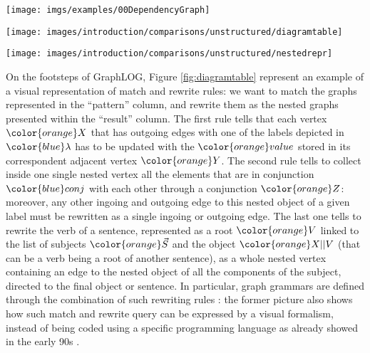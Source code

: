\begin{figure*}[!p]
	\centering
	\texttt{[image: imgs/examples/00DependencyGraph]}
	\caption{Graph representation of the following sentence from Wikipedia: ``\textit{The discovery and publication in 1987 of an early correspondence between Einstein and Maric revealed that they had had a daughter was staying with her parents.}''. }
	\label{fig:dependencygraph}
\end{figure*} 
\begin{figure*}[!pth]
	\begin{minipage}[b]{\textwidth}
		\centering
		\texttt{[image: images/introduction/comparisons/unstructured/diagramtable]}
		\label{fig:diagramtable}
	\end{minipage}
	\begin{minipage}[b]{\textwidth}
		\centering
		\texttt{[image: images/introduction/comparisons/unstructured/nestedrepr]}
		\label{fig:nestedrepr}
	\end{minipage}
	\caption{Translating the full-text representation as a graph in Figure \ref{fig:dependencygraph}: this requires a graph transformation language and the definition of nested graphs.}
	\label{fig:globalconversiontext}
\end{figure*}
	On the footsteps of GraphLOG, Figure \ref{fig:diagramtable} represent an example of a visual representation of match and rewrite rules: we want to match the graphs represented in the ``pattern'' column, and rewrite them as the nested graphs presented within the ``result'' column. 
	The first rule tells that each vertex $\color{orange}X$ that has outgoing edges with one of the labels depicted in $\color{blue}\lambda$ has to be updated with the $\color{orange} value$ stored in its correspondent adjacent vertex $\color{orange} Y$. The second rule tells to collect inside one single nested vertex all the elements that are in conjunction $\color{blue}conj$ with each other through a conjunction $\color{orange} Z$: moreover, any other ingoing and outgoing edge to this nested object of a given label  must be rewritten as a single ingoing or outgoing edge. The last one tells to rewrite the verb of a sentence, represented as a root $\color{orange} V$ linked to the list of subjects $\color{orange} \vec{S}$ and the object $\color{orange}X||V$ (that can be a verb being a root of another sentence), as a whole nested vertex containing an edge to the nested object of all the components of the subject, directed to the final object or sentence. 
	In particular,  graph grammars are defined through the combination of such rewriting rules   \cite{GraphLogAggr,Plump1998Term}: the former  picture also shows how such match and rewrite query can be expressed by a visual formalism, instead of being coded using a specific programming language as already showed in the early 90s \cite{GraphLogAggr}.
	
